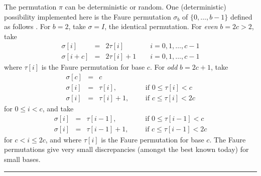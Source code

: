 The permutation $\pi$ can be deterministic or random. One (deterministic)
 possibility implemented here is the Faure permutation $\sigma_b$ of
 $\{0,\dots,b-1\}$ defined as follows \cite{rFAU92a}.
For $b=2$, take $\sigma = I$, the identical permutation. For \textit{even}
 $b=2c > 2$,  take 
\begin{eqnarray}
   \sigma[i] &=& 2\tau[i]\phantom{{} + 1} \qquad i = 0, 1, \ldots, c-1 \\
 \sigma[i+c] &=& 2\tau[i] + 1 \qquad i = 0, 1, \ldots, c-1
\end{eqnarray} 
 where $\tau[i]$ is the Faure 
permutation for base $c$.  For \textit{odd} $b=2c+1$, 
 take 
\begin{eqnarray}
   \sigma[c] &=& c \\
 \sigma[i] &=& \tau[i],\phantom{{} + 1} \qquad \mbox{ if } 0 \le \tau[i] < c\\
  \sigma[i] &=& \tau[i] + 1, \qquad  \mbox{ if } c \le \tau[i] < 2c
\end{eqnarray} 
for $0 \le i < c$, and take
\begin{eqnarray}
 \sigma[i] &=& \tau[i-1],\phantom{{} + 1} \qquad 
   \mbox{ if } 0 \le \tau[i-1] < c\\
  \sigma[i] &=& \tau[i-1]+1, \qquad  \mbox{ if } c \le \tau[i-1] < 2c
\end{eqnarray} 
for  $c < i \le 2c$, and where $\tau[i]$ is the Faure 
permutation for base $c$. The Faure permutations give very small 
discrepancies (amongst the best known today) for small bases.




\bigskip\hrule\bigskip

